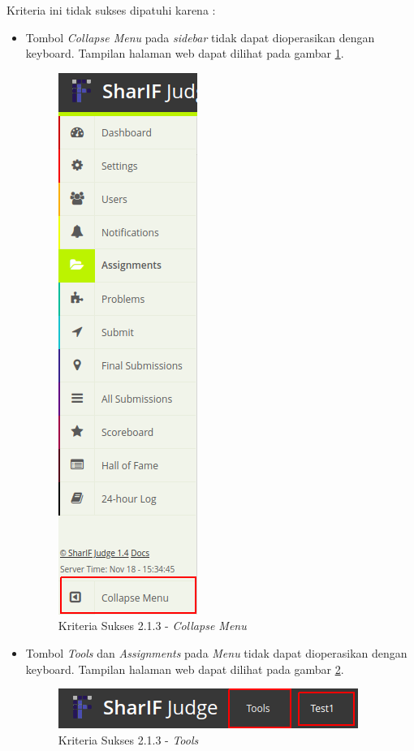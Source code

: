 \documentclass[a4paper,twoside]{article}
\begin{document}
\begin{enumerate}
		Kriteria ini tidak sukses dipatuhi karena :
		\begin{itemize}
			\item Tombol \textit{Collapse Menu} pada \textit{sidebar} tidak dapat dioperasikan dengan keyboard. Tampilan halaman web dapat dilihat pada gambar \ref{fig:kepatuhan_2_1_3_collapse_menu}.
			\begin{figure}[H]
				\centering  
				\includegraphics[scale=0.5]{kepatuhan_2_1_3_collapse_menu}  
				\caption[Kriteria Sukses 2.1.3 - \textit{Collapse Menu}]{Kriteria Sukses 2.1.3 - \textit{Collapse Menu}} 
				\label{fig:kepatuhan_2_1_3_collapse_menu} 
			\end{figure}
			
			\item Tombol \textit{Tools} dan \textit{Assignments} pada \textit{Menu} tidak dapat dioperasikan dengan keyboard. Tampilan halaman web dapat dilihat pada gambar \ref{fig:kepatuhan_2_1_3_tools}.
			\begin{figure}[H]
				\centering  
				\includegraphics[scale=0.5]{kepatuhan_2_1_3_tools}  
				\caption[Kriteria Sukses 2.1.3 - \textit{Tools}]{Kriteria Sukses 2.1.3 - \textit{Tools}} 
				\label{fig:kepatuhan_2_1_3_tools} 
			\end{figure}
			

\end{itemize}
\end{enumerate}
\end{document}
